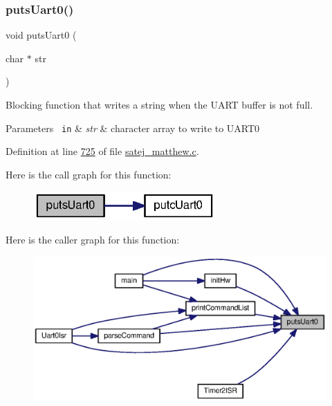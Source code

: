 \subsubsection{\texorpdfstring{putsUart0()}{putsUart0()}}
{\footnotesize\ttfamily void puts\+Uart0 (\begin{DoxyParamCaption}\item[{char $\ast$}]{str }\end{DoxyParamCaption})}



Blocking function that writes a string when the U\+A\+RT buffer is not full. 


\begin{DoxyParams}[1]{Parameters}
\mbox{\texttt{ in}}  & {\em str} & character array to write to U\+A\+R\+T0 \\
\hline
\end{DoxyParams}


Definition at line \mbox{\hyperlink{satej__matthew_8c_source_l00725}{725}} of file \mbox{\hyperlink{satej__matthew_8c_source}{satej\+\_\+matthew.\+c}}.

Here is the call graph for this function\+:
\nopagebreak
\begin{figure}[H]
\begin{center}
\leavevmode
\includegraphics[width=198pt]{satej__matthew_8c_af4adb618930ee1a928705aec083cf726_cgraph}
\end{center}
\end{figure}
Here is the caller graph for this function\+:
\nopagebreak
\begin{figure}[H]
\begin{center}
\leavevmode
\includegraphics[width=350pt]{satej__matthew_8c_af4adb618930ee1a928705aec083cf726_icgraph}
\end{center}
\end{figure}
\mbox{\label{satej__matthew_8c_a086130ac68735e2ba8d56b2dfe45b914}} 
